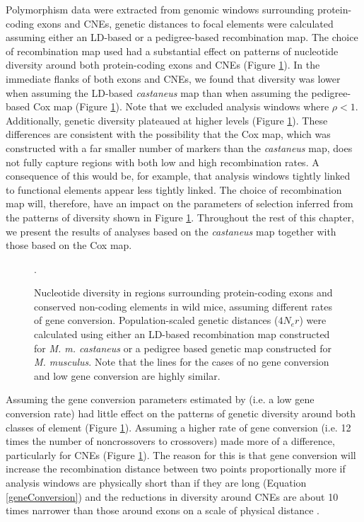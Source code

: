 	Polymorphism data were extracted from genomic windows surrounding protein-coding exons and CNEs, genetic distances to focal elements were calculated assuming either an LD-based or a pedigree-based recombination map. The choice of recombination map used had a substantial effect on patterns of nucleotide diversity around both protein-coding exons and CNEs (Figure \ref{fig:Diversity2x2}). In the immediate flanks of both exons and CNEs, we found that diversity was lower when assuming the LD-based \textit{castaneus} map than when assuming the pedigree-based Cox map (Figure \ref{fig:Diversity2x2}). Note that we excluded analysis windows where $\rho<1$. Additionally, genetic diversity plateaued at higher levels (Figure \ref{fig:Diversity2x2}). These differences are consistent with the possibility that the Cox map, which was constructed with a far smaller number of markers than the \textit{castaneus} map, does not fully capture regions with both low and high recombination rates. A consequence of this would be, for example, that analysis windows tightly linked to functional elements appear less tightly linked. The choice of recombination map will, therefore, have an impact on the parameters of selection inferred from the patterns of diversity shown in Figure \ref{fig:Diversity2x2}. Throughout the rest of this chapter, we present the results of analyses based on the \textit{castaneus} map together with those based on the Cox map.

\linespread{1}
\begin{figure}[h!]
   \centering      
   \noindent{}
 \caption{Nucleotide diversity in regions surrounding protein-coding exons and conserved non-coding elements in wild mice, assuming different rates of gene conversion. Population-scaled genetic distances ($4N_er$) were calculated using either an LD-based recombination map constructed for \textit{M. m. castaneus} or a pedigree based genetic map constructed for \textit{M. musculus}. Note that the lines for the cases of no gene conversion and low gene conversion are highly similar.}.
 
 \label{fig:Diversity2x2}
\end{figure}
\linespread{2}

	 Assuming the gene conversion parameters estimated by \cite{RN263} (i.e. a low gene conversion rate) had little effect on the patterns of genetic diversity around both classes of element (Figure \ref{fig:Diversity2x2}). Assuming a higher rate of gene conversion (i.e. 12 times the number of noncrossovers to crossovers) made more of a difference, particularly for CNEs (Figure \ref{fig:Diversity2x2}). The reason for this is that gene conversion will increase the recombination distance between two points proportionally more if analysis windows are physically short than if they are long (Equation \ref{geneConversion}) and the reductions in diversity around CNEs are about 10 times narrower than those around exons on a scale of physical distance \citep{RN122}. 
	 	 
